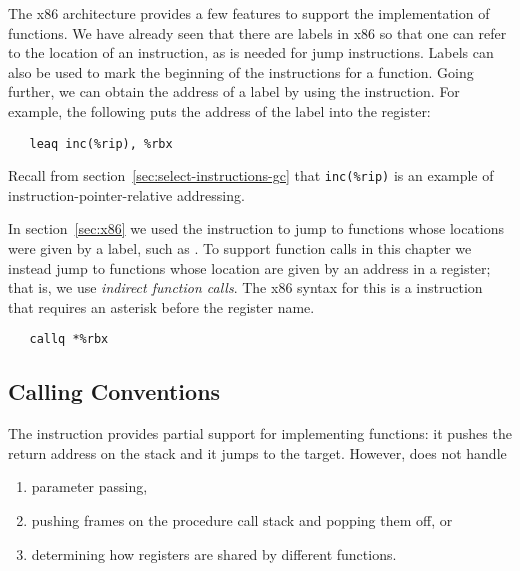 \documentclass[7x10]{TimesAPriori_MIT}%
\numberwithin{theorem}{chapter}
\numberwithin{definition}{chapter}
\numberwithin{equation}{chapter}
\begin{document}


The x86 architecture provides a few features to support the
implementation of functions. We have already seen that there are
labels in x86 so that one can refer to the location of an instruction,
as is needed for jump instructions. Labels can also be used to mark
the beginning of the instructions for a function.  Going further, we
can obtain the address of a label by using the 
instruction. For example, the following puts the address of the
 label into the  register:
\begin{lstlisting}
   leaq inc(%rip), %rbx
\end{lstlisting}
Recall from section~\ref{sec:select-instructions-gc} that
\verb!inc(%rip)! is an example of instruction-pointer-relative
addressing.

In section~\ref{sec:x86} we used the  instruction to jump
to functions whose locations were given by a label, such as
. To support function calls in this chapter we instead
jump to functions whose location are given by an address in
a register; that is, we use \emph{indirect function calls}. The
x86 syntax for this is a  instruction that requires an asterisk
before the register name.
\begin{lstlisting}
   callq *%rbx
\end{lstlisting}


\subsection{Calling Conventions}
\label{sec:calling-conventions-fun}


The  instruction provides partial support for implementing
functions: it pushes the return address on the stack and it jumps to
the target. However,  does not handle
\begin{enumerate}
\item parameter passing,
\item pushing frames on the procedure call stack and popping them off,
  or
\item determining how registers are shared by different functions.
\end{enumerate}
\end{document}
